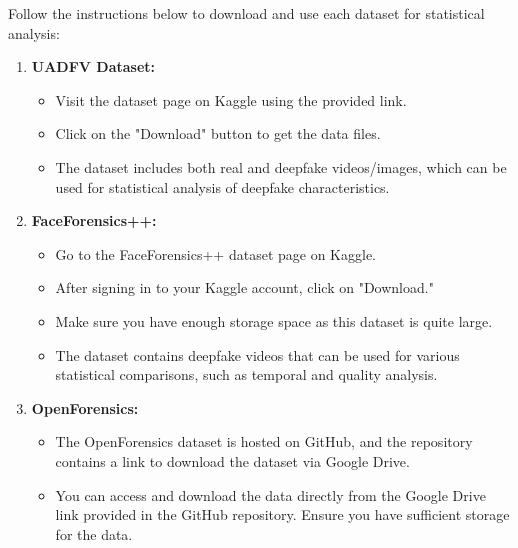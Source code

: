 \documentclass{article}
\begin{document}
Follow the instructions below to download and use each dataset for statistical analysis:

\begin{enumerate}[label=\arabic*.]
    \item \textbf{UADFV Dataset:}
    \begin{itemize}
        \item Visit the dataset page on Kaggle using the provided link.
        \item Click on the "Download" button to get the data files.
        \item The dataset includes both real and deepfake videos/images, which can be used for statistical analysis of deepfake characteristics.
    \end{itemize}

    \item \textbf{FaceForensics++:}
    \begin{itemize}
        \item Go to the FaceForensics++ dataset page on Kaggle.
        \item After signing in to your Kaggle account, click on "Download."
        \item Make sure you have enough storage space as this dataset is quite large.
        \item The dataset contains deepfake videos that can be used for various statistical comparisons, such as temporal and quality analysis.
    \end{itemize}

\item \textbf{OpenForensics:}
\begin{itemize}
    \item The OpenForensics dataset is hosted on GitHub, and the repository contains a link to download the dataset via Google Drive.
    \item You can access and download the data directly from the Google Drive link provided in the GitHub repository. Ensure you have sufficient storage for the data.
\end{itemize}

\end{enumerate}
\end{document}
